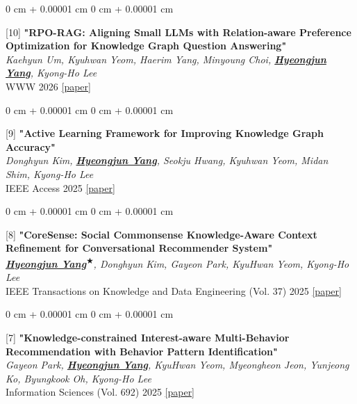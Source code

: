 \documentclass[10pt, letterpaper]{article}
\newenvironment{onecolentry}{
	\begin{adjustwidth}{
			0 cm + 0.00001 cm
		}{
			0 cm + 0.00001 cm
		}
	}{
	\end{adjustwidth}
} %
\begin{document}
\begin{samepage}
		\vspace{0.20 cm}	
		\begin{onecolentry}
			[10] \textbf{"RPO-RAG: Aligning Small LLMs with Relation-aware Preference Optimization for Knowledge Graph Question Answering"}\\
			\textit{Kaehyun Um, Kyuhwan Yeom, Haerim Yang, Minyoung Choi, \textbf{\underline{Hyeongjun Yang}}, Kyong-Ho Lee}\\
			\vspace{0.05 cm}
			WWW 2026
			\href{https://www2026.thewebconf.org/}{[paper]}
		\end{onecolentry}
			
		\vspace{0.20 cm}		
		\begin{onecolentry}
			[9] \textbf{"Active Learning Framework for Improving Knowledge Graph Accuracy"}\\
			\textit{Donghyun Kim, \textbf{\underline{Hyeongjun Yang}}, Seokju Hwang, Kyuhwan Yeom, Midan Shim, Kyong-Ho Lee}\\
			\vspace{0.05 cm}
			IEEE Access 2025 
			\href{https://ieeexplore.ieee.org/document/10926193/}{[paper]}
		\end{onecolentry}
	
	
		
		\vspace{0.20 cm}
		\begin{onecolentry}
			[8] \textbf{"CoreSense: Social Commonsense Knowledge-Aware Context Refinement for Conversational Recommender System"}\\
			\textit{\textbf{\underline{Hyeongjun Yang\textsuperscript{$\bigstar$}}}, Donghyun Kim, Gayeon Park, KyuHwan Yeom, Kyong-Ho Lee}\\
			\vspace{0.05 cm}
			IEEE Transactions on Knowledge and Data Engineering (Vol. 37) 2025 \href{https://ieeexplore.ieee.org/document/10858398}{[paper]}
		\end{onecolentry}
	
		\vspace{0.20 cm}
		\begin{onecolentry}
			[7] \textbf{"Knowledge-constrained Interest-aware Multi-Behavior Recommendation with Behavior Pattern Identification"}\\
			\textit{Gayeon Park, \textbf{\underline{Hyeongjun Yang}}, KyuHwan Yeom, Myeongheon Jeon, Yunjeong Ko, Byungkook Oh, Kyong-Ho Lee}\\
			\vspace{0.05 cm}
			Information Sciences (Vol. 692) 2025 \href{https://www.sciencedirect.com/science/article/pii/S0020025524015664}{[paper]}
		\end{onecolentry}		


\end{samepage}
\end{document}
